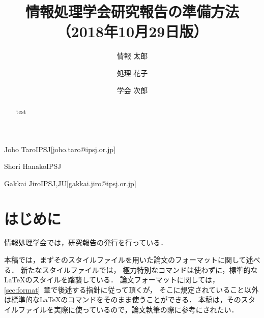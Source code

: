 \documentclass[submit,techrep,noauthor]{ipsj}
\begin{document}
\title{情報処理学会研究報告の準備方法\\
（2018年10月29日版）}





\author{情報 太郎}{Joho Taro}{IPSJ}[joho.taro@ipsj.or.jp]
\author{処理 花子}{Shori Hanako}{IPSJ}
\author{学会 次郎}{Gakkai Jiro}{IPSJ,JU}[gakkai.jiro@ipsj.or.jp]

\begin{abstract}
test
\end{abstract}


%
%
%

\maketitle

\section{はじめに}

情報処理学会では，研究報告の発行を行っている．

本稿では，まずそのスタイルファイルを用いた論文のフォーマットに関して述べる．
新たなスタイルファイルでは，
極力特別なコマンドは使わずに，標準的な\LaTeX のスタイルを踏襲している．
論文フォーマットに関しては，\ref{sec:format}~章で後述する指針に従って頂くが，
そこに規定されていること以外は標準的な\LaTeX のコマンドをそのまま使うことができる．
本稿は，そのスタイルファイルを実際に使っているので，論文執筆の際に参考にされたい．
\end{document}
